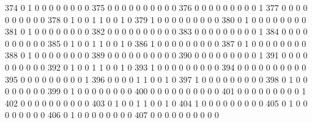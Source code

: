 \documentclass[compress,8pt]{beamer}
\begin{document}
\begin{frame}
\begin{Schunk}
  374      0       1   0              0        0    0       0       0   0   0
  375      0       0   0              0        0    0       0       0   0   0
  376      0       0   0              0        0    0       0       0   0   1
  377      0       0   0              0        0    0       0       0   0   0
  378      0       1   0              0        1    1       0       0   1   0
  379      1       0   0              0        0    0       0       0   0   0
  380      0       1   0              0        0    0       0       0   0   0
  381      0       1   0              0        0    0       0       0   0   0
  382      0       0   0              0        0    0       0       0   0   0
  383      0       0   0              0        0    0       0       0   0   1
  384      0       0   0              0        0    0       0       0   0   0
  385      0       1   0              0        1    1       0       0   1   0
  386      1       0   0              0        0    0       0       0   0   0
  387      0       1   0              0        0    0       0       0   0   0
  388      0       1   0              0        0    0       0       0   0   0
  389      0       0   0              0        0    0       0       0   0   0
  390      0       0   0              0        0    0       0       0   0   1
  391      0       0   0              0        0    0       0       0   0   0
  392      0       1   0              0        1    1       0       0   1   0
  393      1       0   0              0        0    0       0       0   0   0
  394      0       0   0              0        0    0       0       0   0   0
  395      0       0   0              0        0    0       0       0   0   1
  396      0       0   0              0        1    1       0       0   1   0
  397      1       0   0              0        0    0       0       0   0   0
  398      0       1   0              0        0    0       0       0   0   0
  399      0       1   0              0        0    0       0       0   0   0
  400      0       0   0              0        0    0       0       0   0   0
  401      0       0   0              0        0    0       0       0   0   1
  402      0       0   0              0        0    0       0       0   0   0
  403      0       1   0              0        1    1       0       0   1   0
  404      1       0   0              0        0    0       0       0   0   0
  405      0       1   0              0        0    0       0       0   0   0
  406      0       1   0              0        0    0       0       0   0   0
  407      0       0   0              0        0    0       0       0   0   0

\end{Schunk}
\end{frame}
\end{document}
